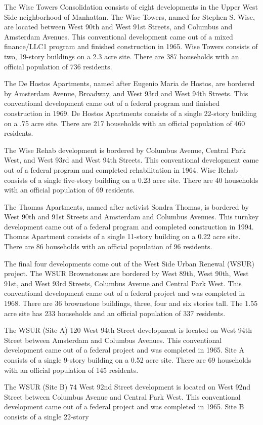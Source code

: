 The Wise Towers Consolidation consists of eight developments in the Upper West Side neighborhood of Manhattan. The Wise Towers, named for Stephen S. Wise, are located between West 90th and West 91st Streets, and Columbus and Amsterdam Avenues. This conventional development came out of a mixed finance/LLC1 program and finished construction in 1965. Wise Towers consists of two, 19-story buildings on a 2.3 acre site. There are 387 households with an official population of 736 residents. \par \vspace{.7\baselineskip}The De Hostos Apartments, named after Eugenio Maria de Hostos, are bordered by Amsterdam Avenue, Broadway, and West 93rd and West 94th Streets. This conventional development came out of a federal program and finished construction in 1969. De Hostos Apartments consists of a single 22-story building on a .75 acre site. There are 217 households with an official population of 460 residents.\par \vspace{.7\baselineskip}The Wise Rehab development is bordered by Columbus Avenue, Central Park West, and West 93rd and West 94th Streets. This conventional development came out of a federal program and completed rehabilitation in 1964. Wise Rehab consists of a single five-story building on a 0.23 acre site. There are 40 households with an official population of 69 residents.\par \vspace{.7\baselineskip}The Thomas Apartments, named after activist Sondra Thomas, is bordered by West 90th and 91st Streets and Amsterdam and Columbus Avenues. This turnkey development came out of a federal program and completed construction in 1994. Thomas Apartment consists of a single 11-story building on a 0.22 acre site. There are 86 households with an official population of 96 residents. \par \vspace{.7\baselineskip}The final four developments come out of the West Side Urban Renewal (WSUR) project. The WSUR Brownstones are bordered by West 89th, West 90th, West 91st, and West 93rd Streets, Columbus Avenue and Central Park West. This conventional development came out of a federal project and was completed in 1968. There are 36 brownstone buildings, three, four and six stories tall. The 1.55 acre site has 233 households and an official population of 337 residents. \par \vspace{.7\baselineskip}The WSUR (Site A) 120 West 94th Street development is located on West 94th Street between Amsterdam and Columbus Avenues. This conventional development came out of a federal project and was completed in 1965. Site A consists of a single 9-story building on a 0.52 acre site. There are 69 households with an official population of 145 residents.\par \vspace{.7\baselineskip}The WSUR (Site B) 74 West 92nd Street development is located on West 92nd Street between Columbus Avenue and Central Park West. This conventional development came out of a federal project and was completed in 1965. Site B consists of a single 22-story 